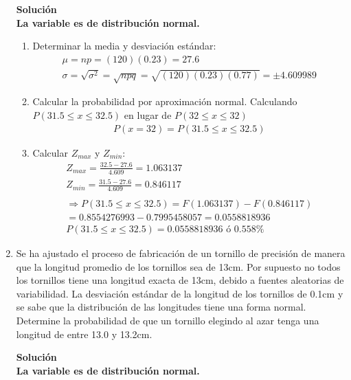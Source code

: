 \begin{enumerate}
    \textbf{Solución}\\
    \textbf{La variable es de distribución normal.}
    \begin{enumerate}
        \item Determinar la media y desviación estándar:
        \begin{gather*}
        \mu =np=(120)(0.23)=27.6\\
        \sigma=\sqrt{\sigma^{2}}	= \sqrt{npq}=\sqrt{(120)(0.23)(0.77)} = \pm 4.609989
        \end{gather*}
        \item Calcular la probabilidad por aproximación normal. Calculando $P(31.5\leq x\leq32.5)$ en lugar de $P(32\leq x\leq32)$\\
        \begin{gather*}
        P(x=32)= P(31.5\leq x\leq32.5)
        \end{gather*}
        \item Calcular $Z_{max}$ y $Z_{min}$:
        \begin{gather*}
        Z_{max}=\frac{32.5-27.6}{4.609}=1.063137\\
        Z_{min}=\frac{31.5-27.6}{4.609}=0.846117\\\\
        \Rightarrow  P(31.5\leq x\leq32.5) = F(1.063137)-F(0.846117)\\
        = 0.8554276993-0.7995458057=0.0558818936\\
        P(31.5\leq x\leq32.5) = 0.0558818936 \text{ ó } 0.558\%
        \end{gather*}
    \end{enumerate}
    
    
    \item Se ha ajustado el proceso de fabricación de un tornillo de precisión de manera que la longitud promedio de los tornillos sea de 13cm. Por supuesto no todos los tornillos tiene una longitud exacta de 13cm, debido a fuentes aleatorias de variabilidad. La desviación estándar de la longitud de los tornillos de 0.1cm y se sabe que la distribución de las longitudes tiene una forma normal. Determine la probabilidad de que un tornillo elegindo al azar tenga una longitud de entre 13.0 y 13.2cm.
    
    \textbf{Solución}\\
    \textbf{La variable es de distribución normal.}
    \begin{enumerate}
        

\end{enumerate}
\end{enumerate}
